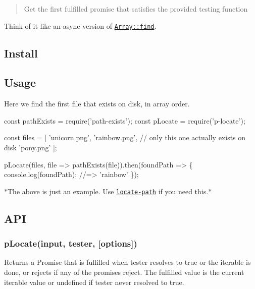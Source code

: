 \begin{quote}
Get the first fulfilled promise that satisfies the provided testing function \end{quote}


Think of it like an async version of \href{https://developer.mozilla.org/en/docs/Web/JavaScript/Reference/Global_Objects/Array/find}{\tt {\ttfamily Array\+::find}}.

\subsection*{Install}




\subsection*{Usage}

Here we find the first file that exists on disk, in array order.


\begin{DoxyCode}
const pathExists = require('path-exists');
const pLocate = require('p-locate');

const files = [
    'unicorn.png',
    'rainbow.png', // only this one actually exists on disk
    'pony.png'
];

pLocate(files, file => pathExists(file)).then(foundPath => \{
    console.log(foundPath);
    //=> 'rainbow'
\});
\end{DoxyCode}


$\ast$\+The above is just an example. Use \href{https://github.com/sindresorhus/locate-path}{\tt {\ttfamily locate-\/path}} if you need this.$\ast$

\subsection*{A\+PI}

\subsubsection*{p\+Locate(input, tester, \mbox{[}options\mbox{]})}

Returns a {\ttfamily Promise} that is fulfilled when {\ttfamily tester} resolves to {\ttfamily true} or the iterable is done, or rejects if any of the promises reject. The fulfilled value is the current iterable value or {\ttfamily undefined} if {\ttfamily tester} never resolved to {\ttfamily true}.

